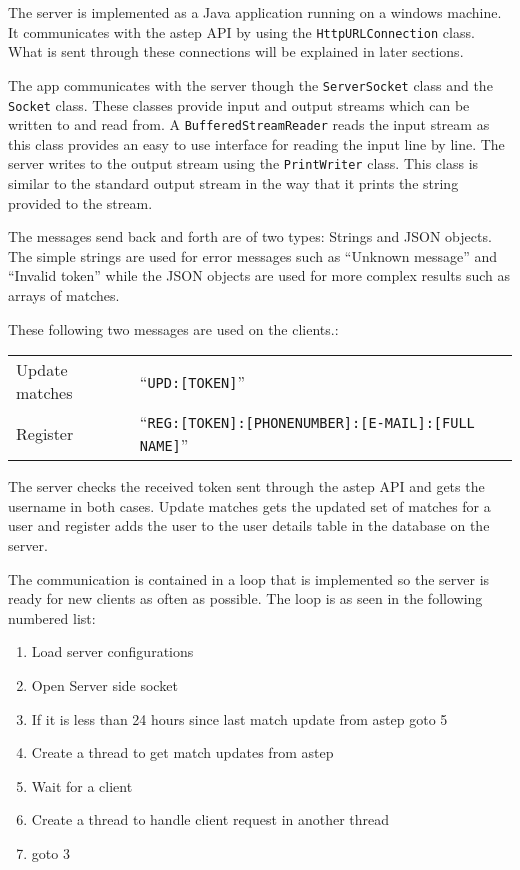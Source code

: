 The server is implemented as a Java application running on a windows machine.
It communicates with the \gls{astep} API by using the \texttt{HttpURLConnection} class.
What is sent through these connections will be explained in later sections.

The app communicates with the server though the \texttt{ServerSocket} class and the \texttt{Socket} class.
These classes provide input and output streams which can be written to and read from.
A \texttt{BufferedStreamReader} reads the input stream as this class provides an easy to use interface for reading the input line by line.
The server writes to the output stream using the \texttt{PrintWriter} class.
This class is similar to the standard output stream in the way that it prints the string provided to the stream.

The messages send back and forth are of two types: Strings and JSON objects.
The simple strings are used for error messages such as \enquote{Unknown message} and \enquote{Invalid token} while the JSON objects are used for more complex results such as arrays of matches.

These following two messages are used on the clients.:

{\centering
	\begin{tabular}{l l}
		Update matches & \enquote{\texttt{UPD:[TOKEN]}}\\
		Register & \enquote{\texttt{REG:[TOKEN]:[PHONENUMBER]:[E-MAIL]:[FULL NAME]}}
	\end{tabular}
}

The server checks the received token sent through the \gls{astep} API and gets the username in both cases.
Update matches gets the updated set of matches for a user and register adds the user to the user details table in the database on the server.

The communication is contained in a loop that is implemented so the server is ready for new clients as often as possible.
The loop is as seen in the following numbered list:

\begin{enumerate}
	\item Load server configurations
	\item Open Server side socket
	\item If it is less than 24 hours since last match update from \gls{astep} goto 5
	\item Create a thread to get match updates from \gls{astep}
	\item Wait for a client
	\item Create a thread to handle client request in another thread
	\item goto 3
\end{enumerate}


